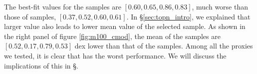 \documentclass[fleqn,usenatbib,useAMS,english]{mnras}
\begin{document}
    The best-fit \sigmvir{} values for the \mcmodel{} samples are $[0.60, 0.65, 0.86, 0.83]$,
    much worse than those of  samples, $[0.37, 0.52, 0.60, 0.61]$.
    In \S \ref{sec:topn_intro}, we explained that larger \sigmvir{} value also leads to
    lower mean \mvir{} value of the selected sample.
    As shown in the right panel of figure \ref{fig:m100_cmod}, the mean \mvir{} of the
    \mcmodel{} \topn{} samples are $[0.52, 0.17, 0.79, 0.53]$ dex lower than that of
    the \maper{} samples.
    Among all the \mvir{} proxies we tested, it is clear that \mcmodel{} has the worst
    performance.
    We will discuss the implications of this in \S {}.

\end{document}
